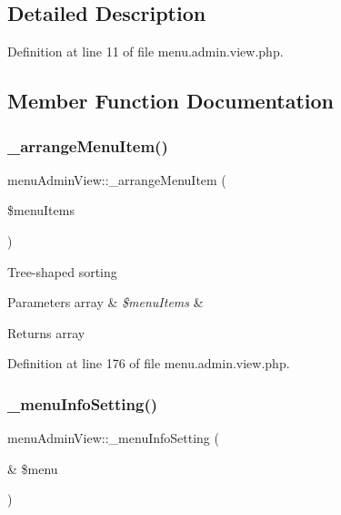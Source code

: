 \subsection{Detailed Description}


Definition at line 11 of file menu.\+admin.\+view.\+php.



\subsection{Member Function Documentation}
\mbox{\label{classmenuAdminView_a9ae9e6a8ade5abcef97bd946d4ca99f7}} 
\subsubsection{\texorpdfstring{\+\_\+arrange\+Menu\+Item()}{\_arrangeMenuItem()}}
{\footnotesize\ttfamily menu\+Admin\+View\+::\+\_\+arrange\+Menu\+Item (\begin{DoxyParamCaption}\item[{}]{\$menu\+Items }\end{DoxyParamCaption})}

Tree-\/shaped sorting 
\begin{DoxyParams}[1]{Parameters}
array & {\em \$menu\+Items} & \\
\hline
\end{DoxyParams}
\begin{DoxyReturn}{Returns}
array 
\end{DoxyReturn}


Definition at line 176 of file menu.\+admin.\+view.\+php.

\mbox{\label{classmenuAdminView_abbcdc54eb95b1c114d43c347fd1f1008}} 
\subsubsection{\texorpdfstring{\+\_\+menu\+Info\+Setting()}{\_menuInfoSetting()}}
{\footnotesize\ttfamily menu\+Admin\+View\+::\+\_\+menu\+Info\+Setting (\begin{DoxyParamCaption}\item[{\&}]{\$menu }\end{DoxyParamCaption})}

